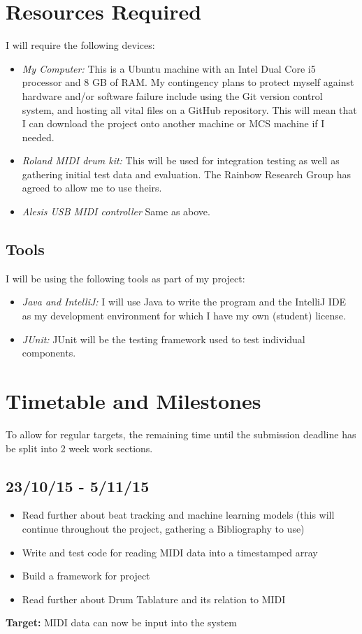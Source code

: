 \documentclass[12pt,a4]{article}
\begin{document}
    \section{\label{sec:Resources}Resources Required}
    I will require the following devices:
        \begin{itemize}
            \item \emph{My Computer:} This is a Ubuntu machine with an Intel Dual Core i5 processor and 8 GB of RAM. My contingency plans to protect myself against hardware and/or software failure include using the Git version control system, and hosting all vital files on a GitHub repository. This will mean that I can download the project onto another machine or MCS machine if I needed.
            \item \emph{Roland MIDI drum kit:} This will be used for integration testing as well as gathering initial test data and evaluation. The Rainbow Research Group has agreed to allow me to use theirs.
            \item \emph{Alesis USB MIDI controller} Same as above.
        \end{itemize}
        \subsection{Tools}
            I will be using the following tools as part of my project:
            \begin{itemize}
                \item \emph{Java and IntelliJ:} I will use Java to write the program and the IntelliJ IDE as my development environment for which I have my own (student) license.
                \item \emph{JUnit:} JUnit will be the testing framework used to test individual components.
            \end{itemize}
    \section{Timetable and Milestones}
To allow for regular targets, the remaining time until the submission deadline has be split into 2 week work sections.

        \subsection{23/10/15 - 5/11/15}
        \begin{itemize}
            \item Read further about beat tracking and machine learning models (this will continue throughout the project, gathering a Bibliography to use)
            \item Write and test code for reading MIDI data into a timestamped array
            \item Build a framework for project
            \item Read further about Drum Tablature and its relation to MIDI
        \end{itemize}
{\bf Target:} MIDI data can now be input into the system
\end{document}
